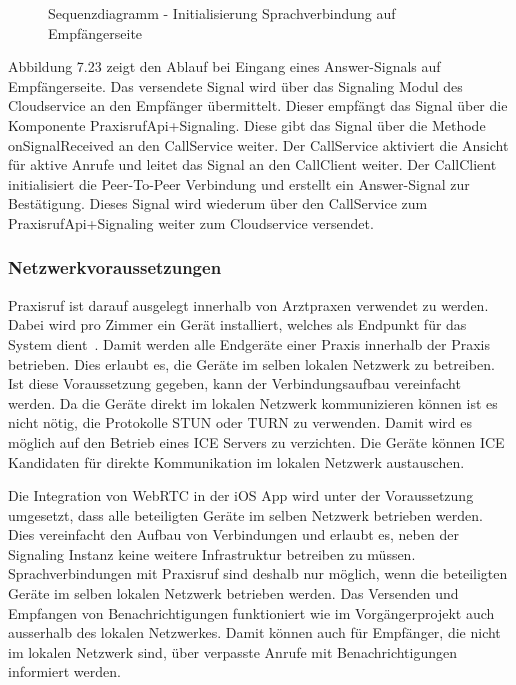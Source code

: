 \begin{figure}[h]
    \centering
    \begin{minipage}[b]{0.85\textwidth}
        \caption{Sequenzdiagramm - Initialisierung Sprachverbindung auf Empfängerseite }
    \end{minipage}
\end{figure}


Abbildung 7.23 zeigt den Ablauf bei Eingang eines Answer-Signals auf Empfängerseite.
Das versendete Signal wird über das Signaling Modul des Cloudservice an den Empfänger übermittelt.
Dieser empfängt das Signal über die Komponente PraxisrufApi+Signaling.
Diese gibt das Signal über die Methode onSignalReceived an den CallService weiter.
Der CallService aktiviert die Ansicht für aktive Anrufe und leitet das Signal an den CallClient weiter.
Der CallClient initialisiert die Peer-To-Peer Verbindung und erstellt ein Answer-Signal zur Bestätigung.
Dieses Signal wird wiederum über den CallService zum PraxisrufApi+Signaling weiter zum Cloudservice versendet.


\subsubsection{Netzwerkvoraussetzungen}

Praxisruf ist darauf ausgelegt innerhalb von Arztpraxen verwendet zu werden.
Dabei wird pro Zimmer ein Gerät installiert, welches als Endpunkt für das System dient~\cite{aufgabenstellung}.
Damit werden alle Endgeräte einer Praxis innerhalb der Praxis betrieben.
Dies erlaubt es, die Geräte im selben lokalen Netzwerk zu betreiben.
Ist diese Voraussetzung gegeben, kann der Verbindungsaufbau vereinfacht werden.
Da die Geräte direkt im lokalen Netzwerk kommunizieren können ist es nicht nötig, die Protokolle STUN oder TURN zu verwenden.
Damit wird es möglich auf den Betrieb eines ICE Servers zu verzichten.
Die Geräte können ICE Kandidaten für direkte Kommunikation im lokalen Netzwerk austauschen.

Die Integration von WebRTC in der iOS App wird unter der Voraussetzung umgesetzt, dass alle beteiligten Geräte im selben Netzwerk betrieben werden.
Dies vereinfacht den Aufbau von Verbindungen und erlaubt es, neben der Signaling Instanz keine weitere Infrastruktur betreiben zu müssen.
Sprachverbindungen mit Praxisruf sind deshalb nur möglich, wenn die beteiligten Geräte im selben lokalen Netzwerk betrieben werden.
Das Versenden und Empfangen von Benachrichtigungen funktioniert wie im Vorgängerprojekt auch ausserhalb des lokalen Netzwerkes.
Damit können auch für Empfänger, die nicht im lokalen Netzwerk sind, über verpasste Anrufe mit Benachrichtigungen informiert werden.

\clearpage
